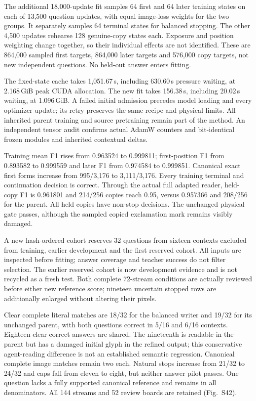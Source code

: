 \documentclass[10pt,a4paper]{article}
\providecommand{\DIFadd}[1]{{\protect\color{blue} \sf #1}} %
\begin{document}
\DIFadd{The additional 18,000-update fit samples 64 first and 64 later training states
on each of 13,500 question updates, with equal image-loss weights for the two
groups. It separately samples 64 terminal states for balanced stopping. The
other 4,500 updates rehearse 128 genuine-copy states each. Exposure and position
weighting change together, so their individual effects are not identified.
These are 864,000 sampled first targets, 864,000 later targets and 576,000 copy
targets, not new independent questions. No held-out answer enters fitting.
}

\DIFadd{The fixed-state cache takes 1,051.67\,s, including 630.60\,s pressure waiting,
at 2.168\,GiB peak CUDA allocation. The new fit takes 156.38\,s, including
20.02\,s waiting, at 1.096\,GiB. A failed initial admission precedes model
loading and every optimizer update; its retry preserves the same recipe and
physical limits. All inherited parent training and source pretraining remain
part of the method. An independent tensor audit confirms actual AdamW counters
and bit-identical frozen modules and inherited contextual deltas.
}

\DIFadd{Training mean F1 rises from 0.963524 to 0.999811; first-position F1 from 0.893582
to 0.999559 and later F1 from 0.974584 to 0.999851. Canonical exact first forms
increase from 995/3,176 to 3,111/3,176. Every training terminal and continuation
decision is correct. Through the actual full adapted reader, held-copy F1 is
0.961801 and 214/256 copies reach 0.95, versus 0.957366 and 208/256 for the
parent. All held copies have non-stop decisions. The unchanged physical gate
passes, although the sampled copied exclamation mark remains visibly damaged.
}

\DIFadd{A new hash-ordered cohort reserves 32 questions from sixteen contexts excluded
from training, earlier development and the first reserved cohort. All inputs
are inspected before fitting; answer coverage and teacher success do not
filter selection. The earlier reserved cohort is now development evidence and
is not recycled as a fresh test. Both complete 72-stream conditions are
actually reviewed before either new reference score; nineteen uncertain
stopped rows are additionally enlarged without altering their pixels.
}

\DIFadd{Clear complete literal matches are 18/32 for the balanced writer and 19/32 for
its unchanged parent, with both questions correct in 5/16 and 6/16 contexts.
Eighteen clear correct answers are shared. The nineteenth is readable in the
parent but has a damaged initial glyph in the refined output; this conservative
agent-reading difference is not an established semantic regression. Canonical
complete image matches remain two each. Natural stops increase from 21/32
to 24/32 and caps fall from eleven to eight, but neither answer pilot passes.
One question lacks a fully supported canonical reference and remains in all
denominators. All 144 streams and 52 review boards are retained (Fig.~S42).
}
\end{document}
